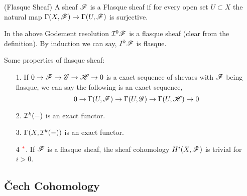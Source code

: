 \documentclass[11pt]{article}
\begin{document}
\begin{Def}{(Flasque Sheaf) }{}
   A sheaf $\mathscr{F}$ is a Flasque sheaf if for every open set $U \subset X$ the natural map $\Gamma(X,\mathscr{F}) \to \Gamma(U,\mathscr{F})$ is surjective.  
\end{Def}

\noindent In the above Godement resolution $\mathcal{I}^0 \mathscr{F}$ is a flasque sheaf (clear from the definition). By induction we can say, $I^k \mathscr{F}$ is flasque. 

\vspace*{0.2cm}

\noindent \textcolor{link}{Some properties of flasque sheaf}:
\begin{itemize}
  \item[1.] If $0 \to \mathscr{F} \to \mathscr{G} \to \mathscr{H} \to 0$ is a exact sequence of shevaes with $\mathscr{F}$ being flasque, we can say the following is an exact sequence, $$0 \to \Gamma(U,\mathscr{F}) \to \Gamma(U,\mathscr{G}) \to \Gamma(U,\mathscr{H}) \to 0$$
  \item[2.] $\mathcal{I}^k(-)$ is an exact functor. 
  \item[3.] $\Gamma(X,\mathcal{I}^k(-))$ is an exact functor. 
  \item[4]$^{\textcolor{red}{*}}$. If $\mathscr{F}$ is a flasque sheaf, the sheaf cohomology $H^i(X,\mathscr{F})$ is trivial for $i > 0$.     
\end{itemize}

\subsection{\v{C}ech Cohomology}
\end{document}
